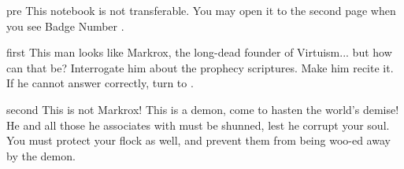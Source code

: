 \documentclass[notebook]{guildcamp1} %
\begin{document}
\startnotebook{\nDoubter{}}

\begin{page}{pre}
This notebook is not transferable. You may open it to the second page when you see Badge Number \cProgrammer{\MYnumber{}}.
\end{page}

\begin{page}{first}
This man looks like Markrox, the long-dead founder of Virtuism... but how can that be? Interrogate him about the prophecy scriptures. Make him recite it.  If he cannot answer correctly, turn to .
\end{page}

\begin{page}{second}
This is not Markrox! This is a demon, come to hasten the world's demise! He and all those he associates with must be shunned, lest he corrupt your soul. You must protect your flock as well, and prevent them from being woo-ed away by the demon.
\end{page}

\endnotebook
\end{document}
